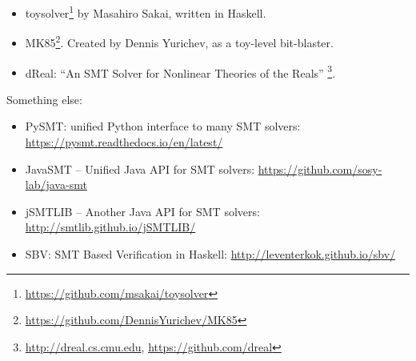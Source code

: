 \begin{itemize}
\item toysolver\footnote{\url{https://github.com/msakai/toysolver}} by Masahiro Sakai, written in Haskell.

\item MK85\footnote{\url{https://github.com/DennisYurichev/MK85}}. Created by Dennis Yurichev, as a toy-level bit-blaster.

\item dReal: ``An SMT Solver for Nonlinear Theories of the Reals''
\footnote{\url{http://dreal.cs.cmu.edu}, \url{https://github.com/dreal}}.

\end{itemize}

Something else:

\begin{itemize}

\item PySMT: unified Python interface to many SMT solvers: \url{https://pysmt.readthedocs.io/en/latest/}

\item JavaSMT -- Unified Java API for SMT solvers: \url{https://github.com/sosy-lab/java-smt}

\item jSMTLIB -- Another Java API for SMT solvers: \url{http://smtlib.github.io/jSMTLIB/}

\item SBV: SMT Based Verification in Haskell: \url{http://leventerkok.github.io/sbv/}

\end{itemize}

